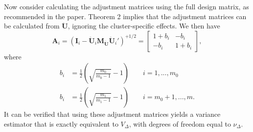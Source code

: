 \documentclass{article}\usepackage[]{graphicx}\usepackage[]{color}
\newcommand{\bm}{\mathbf}
\begin{document}
Now consider calculating the adjustment matrices using the full design matrix, as recommended in the paper. Theorem 2 implies that the adjustment matrices can be calculated from $\bm{\ddot{U}}$, ignoring the cluster-specific effects. We then have
\[
\bm{A}_i = \left(\bm{I}_i - \bm{\ddot{U}}_i \bm{M_{\ddot{U}}} \bm{\ddot{U}}_i'\right)^{+1/2} = \left[\begin{array}{cc} 1 + b_i & - b_i \\ -b_i & 1 + b_i \end{array}\right],
\]
where
\begin{align*}
b_i &= \frac{1}{2}\left(\sqrt{\frac{m_0}{m_0 - 1}} - 1\right) \qquad i = 1,...,m_0 \\
b_i &= \frac{1}{2}\left(\sqrt{\frac{m_1}{m_1 - 1}} - 1\right) \qquad i = m_0 + 1,...,m.
\end{align*}
It can be verified that using these adjustment matrices yields a variance estimator that is exactly equivalent to $V_{\Delta}$, with degrees of freedom equal to $\nu_\Delta$.
\end{document}

